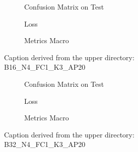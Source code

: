 \begin{figure}
    \centering
    \begin{subfigure}{0.3\linewidth}
        \centering
        
        \caption{Confusion Matrix on Test}
        \label{fig:confMatrixTest-0}
    \end{subfigure}
    \begin{subfigure}{0.3\linewidth}
        \centering
        
        \caption{Loss}
        \label{fig:loss-0}
    \end{subfigure}
    \begin{subfigure}{0.3\linewidth}
        \centering
        
        \caption{Metrics Macro}
        \label{fig:metricsMacro-0}
    \end{subfigure}

    \caption{Caption derived from the upper directory: B16\_N4\_FC1\_K3\_AP20}
    \label{fig:overallCaption-0}
\end{figure}


\begin{figure}
    \centering
    \begin{subfigure}{0.3\linewidth}
        \centering
        
        \caption{Confusion Matrix on Test}
        \label{fig:confMatrixTest-1}
    \end{subfigure}
    \begin{subfigure}{0.3\linewidth}
        \centering
        
        \caption{Loss}
        \label{fig:loss-1}
    \end{subfigure}
    \begin{subfigure}{0.3\linewidth}
        \centering
        
        \caption{Metrics Macro}
        \label{fig:metricsMacro-1}
    \end{subfigure}

    \caption{Caption derived from the upper directory: B32\_N4\_FC1\_K3\_AP20}
    \label{fig:overallCaption-1}
\end{figure}


